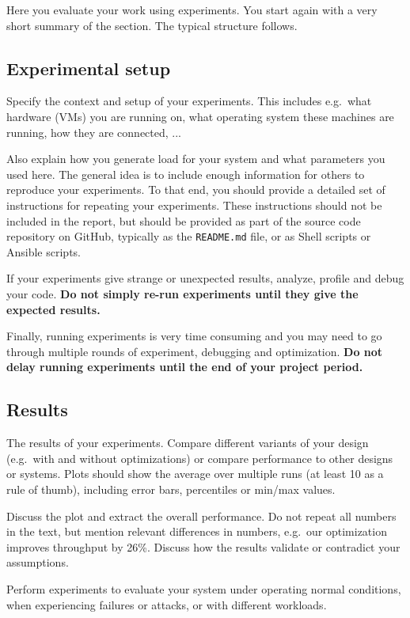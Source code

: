 Here you evaluate your work using experiments. You start
again with a very short summary of the section. The typical
structure follows.

\subsection{Experimental setup}
Specify the context and setup of your experiments. This includes e.g.~what hardware (VMs) you are running on, what operating system these machines are running, how they are connected, ...

Also explain how you generate load for your system and what parameters you used here. The general idea is to include enough information for others to reproduce your experiments. To that end, you should provide a detailed set of instructions for repeating your experiments. These instructions should not be included in the report, but should be provided as part of the source code repository on GitHub, typically as the \texttt{README.md} file, or as Shell scripts or Ansible scripts.

If your experiments give strange or unexpected results, analyze, profile and debug your code. \textbf{Do not simply re-run experiments until they give the expected results.}

Finally, running experiments is very time consuming and you may need to go through multiple rounds of experiment, debugging and optimization. \textbf{Do not delay running experiments until the end of your project period.} 

\subsection{Results}
The results of your experiments. Compare different variants of your design (e.g.~with and without optimizations) or compare performance to other designs or systems. Plots should show the average over multiple runs (at least 10 as a rule of thumb), including error bars, percentiles or min/max values.

Discuss the plot and extract the overall performance. Do not repeat all numbers in the text, but mention relevant differences in numbers, e.g.~our optimization improves throughput by 26\%.
Discuss how the results validate or contradict your assumptions.

Perform experiments to evaluate your system under operating normal conditions, when experiencing failures or attacks, or with different workloads.

